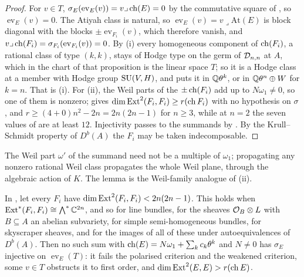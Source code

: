 \begin{proof}
For $v\in T$, $\sigma_{E}(\operatorname{ev}_{E}(v))=v\lrcorner\operatorname{ch}(E)=0$ by the
commutative square of , so $\operatorname{ev}_{E}(v)=0$.
The Atiyah class is natural, so $\operatorname{ev}_{E}(v)=v\lrcorner
\mathrm{At}(E)$ is block diagonal with the blocks $\pm\operatorname{ev}_{F_{i}}(v)$,
which therefore vanish, and $v\lrcorner\operatorname{ch}(F_{i})=\sigma_{F_{i}}
(\operatorname{ev}_{F_{i}}(v))=0$. By (i) every
homogeneous component of $\operatorname{ch}(F_{i})$, a rational class of type $(k,k)$, stays
of Hodge type on the germ of $\mathcal{D}_{n,n}$ at $A$, which in the chart of that
proposition is the linear space $T$; so it is a Hodge class at a member with
Hodge group $\operatorname{SU}(V,H)$, and  puts it in $\mathbb{Q}\theta^{k}$, or
in $\mathbb{Q}\theta^{n}\oplus W$ for $k=n$. That is (i). For (ii), the Weil parts
of the $\pm\operatorname{ch}(F_{i})$ add up to $N\omega_{1}\ne0$, so one of them is nonzero;
 gives $\dim\operatorname{Ext}^{2}(F_{i},F_{i})\ge r(\operatorname{ch} F_{i})$ with
no hypothesis on $\sigma$, and $r\ge(4+0)n^{2}-2n=2n(2n-1)$ for $n\ge3$, while
at $n=2$ the seven values of  are at least $12$. Injectivity
passes to the summands by . By the Krull--Schmidt property
of $D^{b}(A)$ the $F_{i}$ may be taken indecomposable.
\end{proof}

The Weil part $\omega'$ of the summand need not be a multiple of $\omega_{1}$;
propagating any nonzero rational Weil class propagates the whole Weil plane,
through the algebraic action of $K$. The lemma is the Weil-family analogue of
(ii).

\begin{corollary}
\label{cor:naturalsums}
In , let every $F_{i}$ have
$\dim\operatorname{Ext}^{2}(F_{i},F_{i})<2n(2n-1)$. This holds when
$\operatorname{Ext}^{*}(F_{i},F_{i})\cong\bigwedge^{*}\mathbb{C}^{2n}$, and so for line bundles, for
the sheaves $\mathcal{O}_{B}\otimes L$ with $B\subseteq A$ an abelian subvariety, for
simple semi-homogeneous bundles, for skyscraper sheaves, and for the images of
all of these under autoequivalences of $D^{b}(A)$. Then no such sum with
$\operatorname{ch}(E)=N\omega_{1}+\sum_{k}c_{k}\theta^{k}$ and $N\ne0$ has $\sigma_{E}$
injective on $\operatorname{ev}_{E}(T)$: it fails the polarised criterion and
the weakened criterion, some $v\in T$ obstructs it to first order, and
$\dim\operatorname{Ext}^{2}(E,E)>r(\operatorname{ch} E)$.
\end{corollary}

